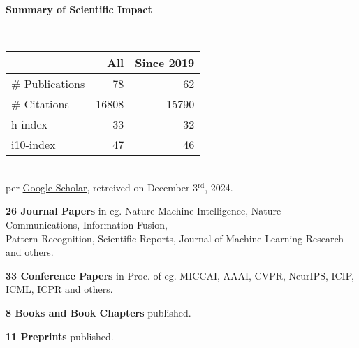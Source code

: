 \headedsection %
{\bf Summary of Scientific Impact}{}{}
{
    \qquad~~~~
    \begin{minipage}[t]{0.6\textwidth}
        \begin{tabular}{lrr}
        \hline
         & All & Since 2019\\
        \hline
        \# Publications & 78     & 62    \\
        \# Citations    & 16808  & 15790 \\
        h-index         & 33     & 32    \\
        i10-index       & 47     & 46    \\
        \hline
    \end{tabular}
    \\
    {\footnotesize{
        per \href{https://scholar.google.com/citations?user=wpLQuroAAAAJ}{Google Scholar},
        retreived on December 3$^\text{rd}$, 2024.
        }
    }
    \end{minipage}

    \ifdefined\shortcv
        \vstep
        {\bf 26 Journal Papers} in eg. Nature Machine Intelligence, Nature Communications, Information Fusion,\\
        \hspace*{\fill} Pattern Recognition, Scientific Reports, Journal of Machine Learning Research and others.

        {\bf 33 Conference Papers} in Proc. of eg. MICCAI, AAAI, CVPR, NeurIPS, ICIP, ICML, ICPR and others.

        {\bf 8 Books and Book Chapters} published.

        {\bf 11 Preprints} published.
        
    \else
        {}
    \fi

}

